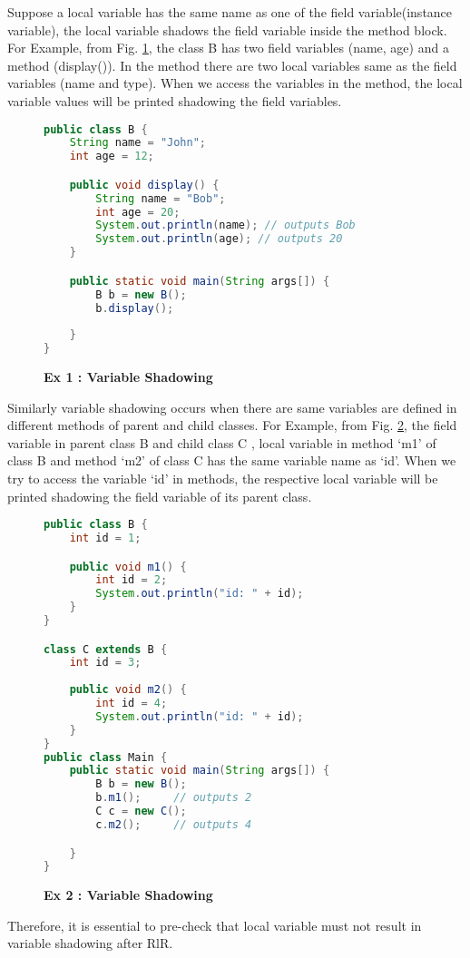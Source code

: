 Suppose a local variable has the same name as one of the field variable(instance variable), the local variable shadows the field variable inside the method block. For Example, from Fig. \ref{figure:precond5_2},  the class B has two field variables (name, age) and a method (display()). In the method there are two local variables same as the field variables (name and type). When we access the variables in the method, the local variable values will be printed shadowing the field variables.

\begin{figure}[th]
\centering
\begin{minipage}[t]{0.95\linewidth}
\begin{lstlisting}[language=java, basicstyle=\scriptsize\ttfamily,frame=single]
public class B {
	String name = "John";
	int age = 12;

	public void display() {
		String name = "Bob";
		int age = 20;
		System.out.println(name); // outputs Bob
		System.out.println(age); // outputs 20
	}

	public static void main(String args[]) {
		B b = new B();
		b.display();
		
	}
}
\end{lstlisting}
\end{minipage}
\caption{\textbf{Ex 1 : Variable Shadowing}}
\label{figure:precond5_2}
\end{figure}

Similarly variable shadowing occurs when there are same variables are defined in different methods of parent and child classes.
For Example, from Fig. \ref{figure:precond5_3}, the field variable  in parent class B and child class C , local variable in method `m1' of class B and method `m2' of class C has the same variable name as `id'. When we try to access the variable `id' in methods, the respective local variable will be printed shadowing the field variable of its parent class.
\begin{figure}[th]
\centering
\begin{minipage}[t]{0.95\linewidth}
\begin{lstlisting}[language=java, basicstyle=\scriptsize\ttfamily,frame=single]
public class B {
	int id = 1;

	public void m1() {
		int id = 2;
		System.out.println("id: " + id);
	}
}

class C extends B {
	int id = 3;
	
	public void m2() {
		int id = 4;
		System.out.println("id: " + id); 
	}
}
public class Main {
	public static void main(String args[]) {
		B b = new B();
		b.m1(); 	// outputs 2
		C c = new C();
		c.m2(); 	// outputs 4

	}
}
\end{lstlisting}
\end{minipage}
\caption{\textbf{Ex 2 : Variable Shadowing}}
\label{figure:precond5_3}
\end{figure}

Therefore, it is essential to pre-check that local variable must not result in variable shadowing after RlR.